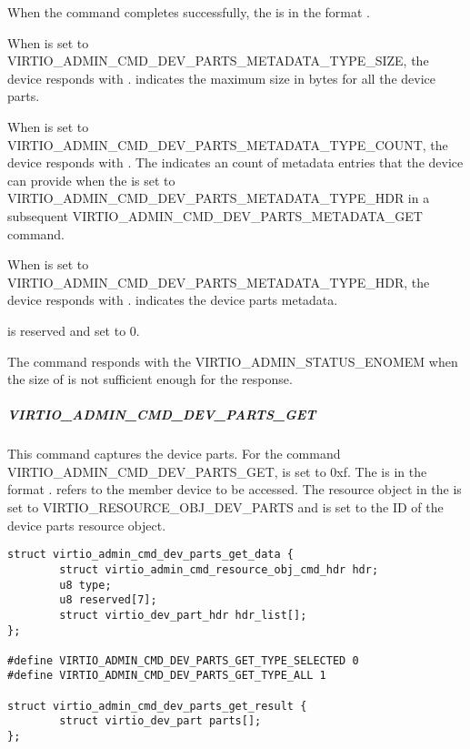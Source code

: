 When the command completes successfully, the
 is in the format
.

When  is set to VIRTIO_ADMIN_CMD_DEV_PARTS_METADATA_TYPE_SIZE,
the device responds with .  indicates
the maximum size in bytes for all the device parts.

When  is set to VIRTIO_ADMIN_CMD_DEV_PARTS_METADATA_TYPE_COUNT, the
device responds with . The
 indicates an count of
 metadata entries that the device can
provide when the  is set to VIRTIO_ADMIN_CMD_DEV_PARTS_METADATA_TYPE_HDR
in a subsequent VIRTIO_ADMIN_CMD_DEV_PARTS_METADATA_GET command.

When  is set to VIRTIO_ADMIN_CMD_DEV_PARTS_METADATA_TYPE_HDR,
the device responds with . 
indicates the device parts metadata.

 is reserved and set to 0.

The command responds with the  VIRTIO_ADMIN_STATUS_ENOMEM
when the size of  is not sufficient enough
for the response.

\subparagraph{VIRTIO_ADMIN_CMD_DEV_PARTS_GET}
\label{par:Basic Facilities of a Virtio Device / Device groups / Group administration commands / Device parts /  Device parts handling commands / VIRTIO-ADMIN-CMD-DEV-PARTS-GET}

This command captures the device parts. For the command
VIRTIO_ADMIN_CMD_DEV_PARTS_GET,  is set to 0xf.
The  is in the format
.
 refers to the member device to be accessed.
The resource object  in the  is set to
VIRTIO_RESOURCE_OBJ_DEV_PARTS and  is set to the ID of the
device parts resource object.

\begin{lstlisting}
struct virtio_admin_cmd_dev_parts_get_data {
        struct virtio_admin_cmd_resource_obj_cmd_hdr hdr;
        u8 type;
        u8 reserved[7];
        struct virtio_dev_part_hdr hdr_list[];
};

#define VIRTIO_ADMIN_CMD_DEV_PARTS_GET_TYPE_SELECTED 0
#define VIRTIO_ADMIN_CMD_DEV_PARTS_GET_TYPE_ALL 1

struct virtio_admin_cmd_dev_parts_get_result {
        struct virtio_dev_part parts[];
};

\end{lstlisting}

